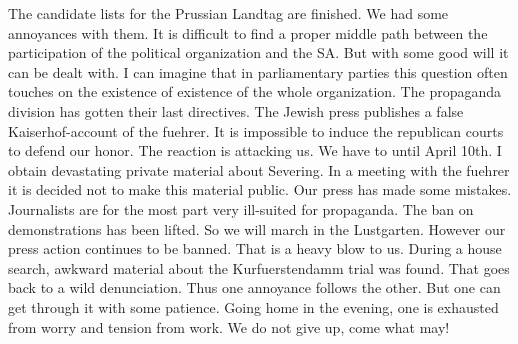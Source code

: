 The candidate lists for the Prussian Landtag are finished. We had some annoyances with them. It is difficult to find a proper middle path between the participation of the political organization and the SA. But with some good will it can be dealt with. I can imagine that in parliamentary parties this question often touches on the existence of existence of the whole organization. The propaganda division has gotten their last directives. The Jewish press publishes a false Kaiserhof-account of the fuehrer. It is impossible to induce the republican courts to defend our honor. The reaction is attacking us. We have to  until April 10th. I obtain devastating private material about Severing. In a meeting with the fuehrer it is decided not to make this material public.  Our press has made some mistakes. Journalists are for the most part very ill-suited for propaganda. The ban on demonstrations has been lifted. So we will march in the Lustgarten. However our press action continues to be banned. That is a heavy blow to us. During a house search, awkward material about the Kurfuerstendamm trial was found. That goes back to a wild denunciation.  Thus one annoyance follows the other. But one can get through it with some patience. Going home in the evening, one is exhausted from worry and tension from work. We do not give up, come what may!


